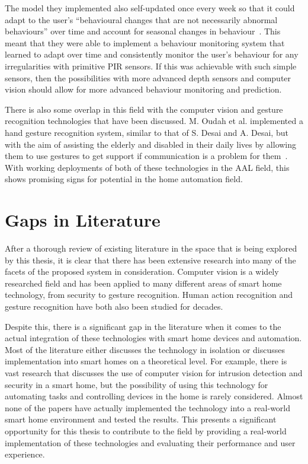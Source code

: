 The model they implemented also self-updated once every week so that it could adapt to the user's ``behavioural changes that are not necessarily abnormal behaviours'' over time and account for seasonal changes in behaviour~\cite{Eisa17}.
This meant that they were able to implement a behaviour monitoring system that learned to adapt over time and consistently monitor the user's behaviour for any irregularities with primitive PIR sensors.
If this was achievable with such simple sensors, then the possibilities with more advanced depth sensors and computer vision should allow for more advanced behaviour monitoring and prediction.

There is also some overlap in this field with the computer vision and gesture recognition technologies that have been discussed.
M. Oudah et al. implemented a hand gesture recognition system, similar to that of S. Desai and A. Desai, but with the aim of assisting the elderly and disabled in their daily lives by allowing them to use gestures to get support if communication is a problem for them~\cite{Ouda21}.
With working deployments of both of these technologies in the AAL field, this shows promising signs for potential in the home automation field.

\section{Gaps in Literature}
After a thorough review of existing literature in the space that is being explored by this thesis, it is clear that there has been extensive research into many of the facets of the proposed system in consideration.
Computer vision is a widely researched field and has been applied to many different areas of smart home technology, from security to gesture recognition.
Human action recognition and gesture recognition have both also been studied for decades.

Despite this, there is a significant gap in the literature when it comes to the actual integration of these technologies with smart home devices and automation.
Most of the literature either discusses the technology in isolation or discusses implementation into smart homes on a theoretical level.
For example, there is vast research that discusses the use of computer vision for intrusion detection and security in a smart home, but the possibility of using this technology for automating tasks and controlling devices in the home is rarely considered. 
Almost none of the papers have actually implemented the technology into a real-world smart home environment and tested the results.
This presents a significant opportunity for this thesis to contribute to the field by providing a real-world implementation of these technologies and evaluating their performance and user experience.

